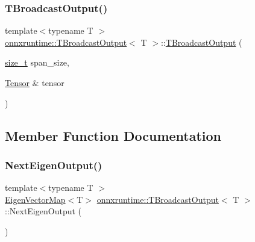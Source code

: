\subsubsection{\texorpdfstring{T\+Broadcast\+Output()}{TBroadcastOutput()}}
{\footnotesize\ttfamily template$<$typename T $>$ \\
\mbox{\hyperlink{structonnxruntime_1_1TBroadcastOutput}{onnxruntime\+::\+T\+Broadcast\+Output}}$<$ T $>$\+::\mbox{\hyperlink{structonnxruntime_1_1TBroadcastOutput}{T\+Broadcast\+Output}} (\begin{DoxyParamCaption}\item[{\mbox{\hyperlink{mlasi_8h_a503efbc1c6e50825320ad909366b78ab}{size\+\_\+t}}}]{span\+\_\+size,  }\item[{\mbox{\hyperlink{classonnxruntime_1_1Tensor}{Tensor}} \&}]{tensor }\end{DoxyParamCaption})\hspace{0.3cm}{\ttfamily [inline]}}



\subsection{Member Function Documentation}
\mbox{\label{structonnxruntime_1_1TBroadcastOutput_a21141049895bc0c538be694381cd9645}} 
\subsubsection{\texorpdfstring{Next\+Eigen\+Output()}{NextEigenOutput()}}
{\footnotesize\ttfamily template$<$typename T $>$ \\
\mbox{\hyperlink{namespaceonnxruntime_ac267a13e3484233cf911a77bc106f099}{Eigen\+Vector\+Map}}$<$T$>$ \mbox{\hyperlink{structonnxruntime_1_1TBroadcastOutput}{onnxruntime\+::\+T\+Broadcast\+Output}}$<$ T $>$\+::Next\+Eigen\+Output (\begin{DoxyParamCaption}{ }\end{DoxyParamCaption})\hspace{0.3cm}{\ttfamily [inline]}}

\mbox{\label{structonnxruntime_1_1TBroadcastOutput_a7056a013eee7a4682a82da12b5f2f42f}} 
